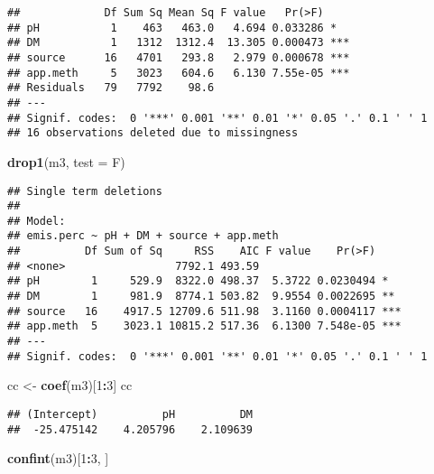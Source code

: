 \documentclass[
]{article}
\newenvironment{Shaded}{\begin{snugshade}}{\end{snugshade}}
\newcommand{\AttributeTok}[1]{\textcolor[rgb]{0.13,0.29,0.53}{#1}}
\newcommand{\DecValTok}[1]{\textcolor[rgb]{0.00,0.00,0.81}{#1}}
\newcommand{\FunctionTok}[1]{\textcolor[rgb]{0.13,0.29,0.53}{\textbf{#1}}}
\newcommand{\NormalTok}[1]{#1}
\newcommand{\OtherTok}[1]{\textcolor[rgb]{0.56,0.35,0.01}{#1}}
\newcommand{\SpecialCharTok}[1]{\textcolor[rgb]{0.81,0.36,0.00}{\textbf{#1}}}
\newcommand{\StringTok}[1]{\textcolor[rgb]{0.31,0.60,0.02}{#1}}
\begin{document}
\begin{verbatim}
##             Df Sum Sq Mean Sq F value   Pr(>F)    
## pH           1    463   463.0   4.694 0.033286 *  
## DM           1   1312  1312.4  13.305 0.000473 ***
## source      16   4701   293.8   2.979 0.000678 ***
## app.meth     5   3023   604.6   6.130 7.55e-05 ***
## Residuals   79   7792    98.6                     
## ---
## Signif. codes:  0 '***' 0.001 '**' 0.01 '*' 0.05 '.' 0.1 ' ' 1
## 16 observations deleted due to missingness
\end{verbatim}

\begin{Shaded}
\begin{Highlighting}[]
\FunctionTok{drop1}\NormalTok{(m3, }\AttributeTok{test =} \StringTok{\textquotesingle{}F\textquotesingle{}}\NormalTok{)}
\end{Highlighting}
\end{Shaded}

\begin{verbatim}
## Single term deletions
## 
## Model:
## emis.perc ~ pH + DM + source + app.meth
##          Df Sum of Sq     RSS    AIC F value    Pr(>F)    
## <none>                 7792.1 493.59                      
## pH        1     529.9  8322.0 498.37  5.3722 0.0230494 *  
## DM        1     981.9  8774.1 503.82  9.9554 0.0022695 ** 
## source   16    4917.5 12709.6 511.98  3.1160 0.0004117 ***
## app.meth  5    3023.1 10815.2 517.36  6.1300 7.548e-05 ***
## ---
## Signif. codes:  0 '***' 0.001 '**' 0.01 '*' 0.05 '.' 0.1 ' ' 1
\end{verbatim}

\begin{Shaded}
\begin{Highlighting}[]
\NormalTok{cc }\OtherTok{\textless{}{-}} \FunctionTok{coef}\NormalTok{(m3)[}\DecValTok{1}\SpecialCharTok{:}\DecValTok{3}\NormalTok{]}
\NormalTok{cc}
\end{Highlighting}
\end{Shaded}

\begin{verbatim}
## (Intercept)          pH          DM 
##  -25.475142    4.205796    2.109639
\end{verbatim}

\begin{Shaded}
\begin{Highlighting}[]
\FunctionTok{confint}\NormalTok{(m3)[}\DecValTok{1}\SpecialCharTok{:}\DecValTok{3}\NormalTok{, ]}
\end{Highlighting}
\end{Shaded}
\end{document}
